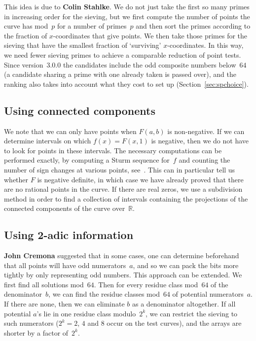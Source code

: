 \documentclass[12pt,a4paper,oneside]{amsart}
\newcommand{\R}{{\mathbb R}}
\begin{document}
This idea is due to \textbf{Colin Stahlke}. We do not just take the first so many
primes in increasing order for the sieving, but we first compute the
number of points the curve has mod~$p$ for a number of primes~$p$ and then
sort the primes according to the fraction of $x$-coordinates that give points.
We then take those primes for the sieving that have the smallest fraction
of `surviving' $x$-coordinates. In this way, we need fewer sieving primes
to achieve a comparable reduction of point tests. Since version~3.0.0 the
candidates include the odd composite numbers below~$64$
(a candidate sharing a prime with one already taken is passed over),
and the ranking also takes into account what they cost to set up
(Section~\ref{sec:spchoice}).

\subsection{Using connected components}

We note that we can only have points when $F(a, b)$ is non-negative.
If we can determine intervals on which $f(x) = F(x, 1)$ is negative, then
we do not have to look for points in these intervals. The necessary
computations can be performed exactly, by computing a Sturm sequence
for~$f$ and counting the number of sign changes at various points,
see~\cite[Thm.~4.1.10]{Cohen}. This can in particular tell us whether
$F$ is negative definite, in which case we have already proved that there
are no rational points in the curve. If there are real zeros, we use
a subdivision method in order to find a collection of intervals containing
the projections of the connected components of the curve over~$\R$.

\subsection{Using 2-adic information}

\textbf{John Cremona} suggested that in some cases, one can determine beforehand
that all points will have odd numerators~$a$, and so we can pack the
bits more tightly by only representing odd numbers. This approach can be
extended. We first find all solutions mod~$64$. Then for every
residue class mod~$64$ of the denominator~$b$, we can find the residue
classes mod~$64$ of potential numerators~$a$. If there are none, then we
can eliminate $b$ as a denominator altogether. If all potential $a$'s lie
in one residue class modulo~$2^k$, we can restrict the sieving to such numerators
($2^k = 2$, $4$ and $8$ occur on the test curves), and the arrays
are shorter by a factor of~$2^k$.
\end{document}
